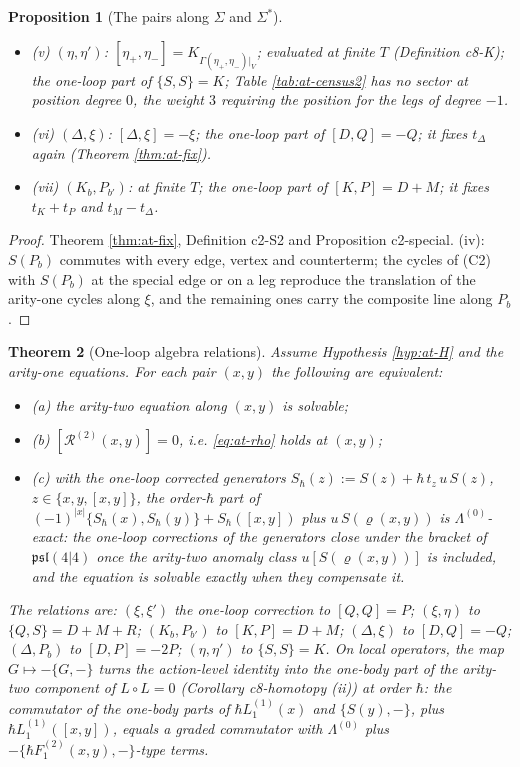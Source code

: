 \documentclass[11pt]{article}
\numberwithin{equation}{section}
\theoremstyle{plain}
\newtheorem{theorem}{Theorem}[section]
\newtheorem{proposition}[theorem]{Proposition}
\theoremstyle{definition}
\begin{document}
\begin{proposition}[The pairs along $\Sigma$ and $\Sigma^*$]
\begin{itemize}
\item (v) $(\eta,\eta')$: $[\eta_+,\eta_-]=K_{\Gamma(\eta_+,\eta_-)|_V}$; evaluated at finite $T$ (Definition c8-K); the one-loop part of $\{S,S\}=K$; Table \ref{tab:at-census2} has no sector at position degree $0$, the weight $3$ requiring the position for the legs of degree $-1$.
\item (vi) $(\Delta,\xi)$: $[\Delta,\xi]=-\xi$; the one-loop part of $[D,Q]=-Q$; it fixes $t_\Delta$ again (Theorem \ref{thm:at-fix}).
\item (vii) $(K_b,P_{b'})$: at finite $T$; the one-loop part of $[K,P]=D+M$; it fixes $t_K+t_P$ and $t_M-t_\Delta$.
\end{itemize}
\end{proposition}

\begin{proof}
Theorem \ref{thm:at-fix}, Definition c2-S2 and Proposition c2-special. (iv): $S(P_b)$ commutes with every edge, vertex and counterterm; the cycles of (C2) with $S(P_b)$ at the special edge or on a leg reproduce the translation of the arity-one cycles along $\xi$, and the remaining ones carry the composite line along $P_b$.
\end{proof}

\begin{theorem}[One-loop algebra relations]
\label{thm:at-algebra}
Assume Hypothesis \ref{hyp:at-H} and the arity-one equations. For each pair $(x,y)$ the following are equivalent:
\begin{itemize}
\item (a) the arity-two equation along $(x,y)$ is solvable;
\item (b) $[\mathcal R^{(2)}(x,y)]=0$, i.e. \eqref{eq:at-rho} holds at $(x,y)$;
\item (c) with the one-loop corrected generators $S_\hbar(z):=S(z)+\hbar\,t_z\,u\,S(z)$, $z\in\{x,y,[x,y]\}$, the order-$\hbar$ part of $(-1)^{|x|}\{S_\hbar(x),S_\hbar(y)\}+S_\hbar([x,y])$ plus $u\,S(\varrho(x,y))$ is $\Lambda^{(0)}$-exact: the one-loop corrections of the generators close under the bracket of $\mathfrak{psl}(4|4)$ once the arity-two anomaly class $u[S(\varrho(x,y))]$ is included, and the equation is solvable exactly when they compensate it.
\end{itemize}
The relations are: $(\xi,\xi')$ the one-loop correction to $[Q,Q]=P$; $(\xi,\eta)$ to $\{Q,S\}=D+M+R$; $(K_b,P_{b'})$ to $[K,P]=D+M$; $(\Delta,\xi)$ to $[D,Q]=-Q$; $(\Delta,P_b)$ to $[D,P]=-2P$; $(\eta,\eta')$ to $\{S,S\}=K$. On local operators, the map $G\mapsto-\{G,-\}$ turns the action-level identity into the one-body part of the arity-two component of $L\circ L=0$ (Corollary c8-homotopy (ii)) at order $\hbar$: the commutator of the one-body parts of $\hbar L_1^{(1)}(x)$ and $\{S(y),-\}$, plus $\hbar L_1^{(1)}([x,y])$, equals a graded commutator with $\Lambda^{(0)}$ plus $-\{\hbar F_1^{(2)}(x,y),-\}$-type terms.
\end{theorem}
\end{document}
